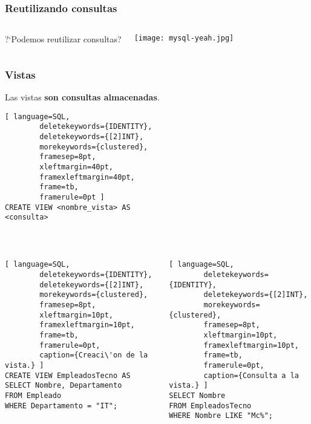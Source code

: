\begin{frame}
    \frametitle{Reutilizando consultas}

    \begin{columns}
    \centering
    \huge ?`Podemos reutilizar consultas?

        \texttt{[image: mysql-yeah.jpg]}
    \end{columns}

\end{frame}

\begin{frame}[fragile]
    \frametitle{Vistas}

    Las vistas \textbf{son consultas almacenadas}. 

	\begin{lstlisting}[ language=SQL,
		deletekeywords={IDENTITY},
		deletekeywords={[2]INT},
		morekeywords={clustered},
		framesep=8pt,
		xleftmargin=40pt,
		framexleftmargin=40pt,
		frame=tb,
		framerule=0pt ]
CREATE VIEW <nombre_vista> AS
<consulta>
\end{lstlisting}

    \


    \begin{columns}[t]
	\begin{lstlisting}[ language=SQL,
		deletekeywords={IDENTITY},
		deletekeywords={[2]INT},
		morekeywords={clustered},
		framesep=8pt,
		xleftmargin=10pt,
		framexleftmargin=10pt,
		frame=tb,
		framerule=0pt,
        caption={Creaci\'on de la vista.} ]
CREATE VIEW EmpleadosTecno AS
SELECT Nombre, Departamento
FROM Empleado
WHERE Departamento = "IT";
\end{lstlisting}

	\begin{lstlisting}[ language=SQL,
		deletekeywords={IDENTITY},
		deletekeywords={[2]INT},
		morekeywords={clustered},
		framesep=8pt,
		xleftmargin=10pt,
		framexleftmargin=10pt,
		frame=tb,
		framerule=0pt,
        caption={Consulta a la vista.} ]
SELECT Nombre
FROM EmpleadosTecno
WHERE Nombre LIKE "Mc%";
\end{lstlisting}
    \end{columns}

\end{frame}